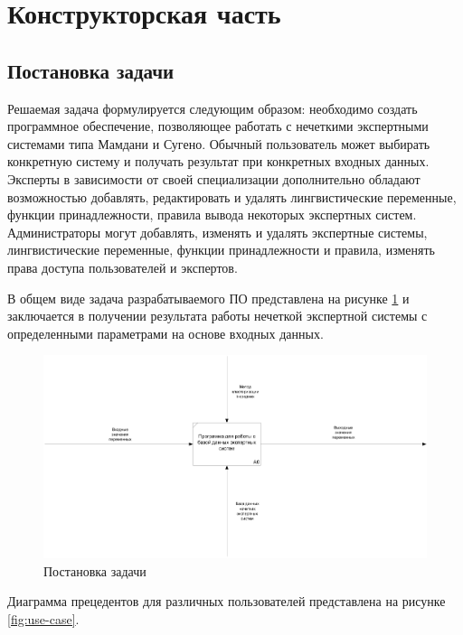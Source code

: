\section{Конструкторская часть}

\subsection{Постановка задачи}
Решаемая задача формулируется следующим образом: необходимо создать программное обеспечение, позволяющее работать с  нечеткими экспертными системами типа Мамдани и Сугено. Обычный пользователь может выбирать конкретную систему и получать результат при конкретных входных данных. Эксперты в зависимости от своей специализации дополнительно обладают возможностью добавлять, редактировать и удалять лингвистические переменные, функции принадлежности, правила вывода некоторых экспертных систем. Администраторы могут добавлять, изменять и удалять экспертные системы, лингвистические переменные, функции принадлежности и правила, изменять права доступа пользователей и экспертов.

В общем виде задача разрабатываемого ПО представлена на рисунке \ref{fig:idef} и заключается в получении результата работы нечеткой экспертной системы с определенными параметрами на основе входных данных.

\begin{figure}[H]
	\centering
	\includegraphics[width=1\linewidth]{img/Idef.png}
	\caption{Постановка задачи}
	\label{fig:idef}
\end{figure}

Диаграмма прецедентов для различных пользователей представлена на рисунке \ref{fig:use-case}.

